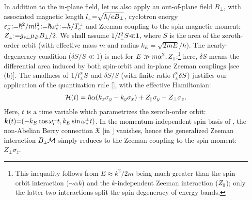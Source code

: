 \documentclass[aps, showpacs, twocolumn, notitlepage, superscriptaddress]{revtex4-1}
\begin{document}
In addition to the in-plane field, let us also apply an out-of-plane field $B_{\perp}$, with associated magnetic length $l_{\scriptscriptstyle{\perp}}{=}\sqrt{\hbar/eB_{\perp}}$, cyclotron energy $\varepsilon^{\scriptscriptstyle{\perp}}_c{:}{=}\hbar^2/ml_{\scriptscriptstyle{\perp}}^2{:}{=}\hbar \omega_c^{\scriptscriptstyle{\perp}}{:}{=}h/T_c^{\scriptscriptstyle{\perp}}$ and Zeeman coupling to the spin magnetic moment:  $Z_{\scriptscriptstyle{\perp}}{:}{=}{g_{s\perp}}\mu_B B_{\perp}/2$. We shall assume  $1/l_{\scriptscriptstyle{\perp}}^2S{\ll}1$, where $S$ is the area of the zeroth-order orbit (with effective mass $m$ and radius $k_E{=}\sqrt{2mE}/\hbar$). The nearly-degeneracy condition ($\delta S/S{\ll}1$) is met for $E\gg m\alpha^2, Z_{\scriptscriptstyle{\parallel}}$;\footnote{This inequality follows from  $E\approx k^2/2m$ being much greater than the spin-orbit interaction ($\sim \alpha k$) and the $k$-independent Zeeman interaction ($Z_{\scriptscriptstyle{\parallel}}$); only the latter two interactions split the spin degeneracy of energy bands.} here, $\delta S$ means the differential area induced by both spin-orbit and in-plane Zeeman couplings [see (b)].  The smallness of $1/l_{\scriptscriptstyle{\perp}}^2S$ and $\delta S/S$ (with finite ratio $l_{\scriptscriptstyle{\perp}}^2\delta S$) justifies our application of the quantization rule [], with the effective Hamiltonian: 
\begin{equation}
{\cal H}(t)=\hbar\alpha(k_{x}\sigma_{y}-k_{y}\sigma_{x})+Z_\parallel\sigma_{y}-Z_\perp\sigma_{z}.\label{calHRZ}
\end{equation}
Here, $t$ is a time variable which parametrizes the zeroth-order orbit:
$\boldsymbol{k}(t){=}({-}k_E \cos \omega_c^{\scriptscriptstyle{\perp}} t, k_E \sin \omega_c^{\scriptscriptstyle{\perp}} t )$. In the momentum-independent spin basis of , the non-Abelian Berry connection $\mathfrak{X}$ [in ]  vanishes, hence the generalized Zeeman interaction $B_{\scriptscriptstyle{\perp}}{\cal M}$ simply reduces to the Zeeman coupling to the spin  moment: $Z_\perp\sigma_{z}$.
\end{document}

